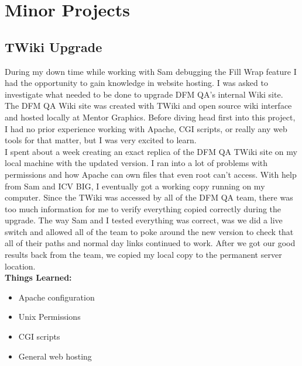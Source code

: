 \documentclass[letterpaper,10pt,notitlepage,fleqn]{article}
\begin{document}
\section{Minor Projects}

\subsection{TWiki Upgrade}
\indent During my down time while working with Sam debugging the Fill Wrap feature I had 
the opportunity to gain knowledge in website hosting. I was asked to investigate 
what needed to be done to upgrade DFM QA's internal Wiki site. The DFM QA Wiki 
site was created with TWiki and open source wiki interface and hosted locally at Mentor 
Graphics. Before diving head first into this project, I had no prior experience working 
with Apache, CGI scripts, or really any web tools for that matter, but I was very 
excited to learn. \\
\indent I spent about a week creating an exact replica of the DFM QA TWiki site on my local 
machine with the updated version. I ran into a lot of problems with permissions 
and how Apache can own files that even root can't access. With help from Sam and 
ICV BIG, I eventually got a working copy running on my computer. Since the TWiki 
was accessed by all of the DFM QA team, there was too much information for me to 
verify everything copied correctly during the upgrade. The way Sam and I tested 
everything was correct, was we did a live switch and allowed all of the team to 
poke around the new version to check that all of their paths and normal day links 
continued to work. After we got our good results back from the team, we copied my 
local copy to the permanent server location. \\

\textbf{Things Learned:}
    \begin{itemize} 
        \item Apache configuration
        \item Unix Permissions
        \item CGI scripts
        \item General web hosting 
    \end{itemize}
\end{document}
